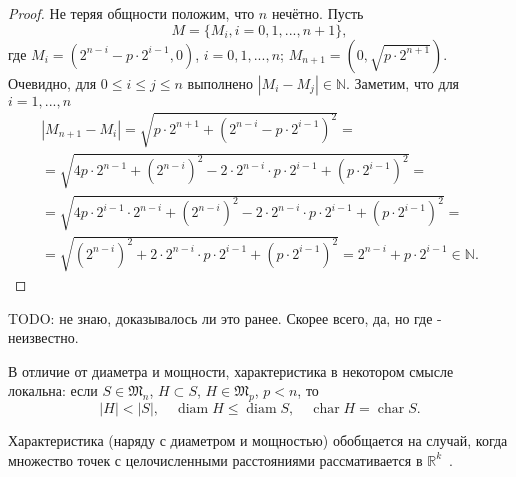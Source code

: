 \begin{proof}
	Не теряя общности положим, что $n$ нечётно.
	Пусть
	\begin{equation*}
		M = \{M_i, i =0,1,...,n+1\},
	\end{equation*}
	где
	$M_i = (2^{n-i}-p\cdot 2^{i-1},0)$, $i=0,1,...,n$;
	$M_{n+1} = (0,\sqrt{p \cdot 2^{n+1}})$.
	Очевидно, для $0\leqslant i \leqslant j \leqslant n$ выполнено
	$|M_i- M_j|\in\mathbb{N}$.
	Заметим, что для $i=1,...,n$
	\begin{multline*}
		|M_{n+1} - M_i| =
		\sqrt{p\cdot 2^{n+1} + (2^{n-i}-p\cdot2^{i-1})^2}
		=
		\\=
		\sqrt{4p\cdot 2^{n-1} + (2^{n-i})^2 - 2 \cdot 2^{n-i} \cdot p \cdot 2^{i-1} + (p\cdot 2^{i-1})^2}
		=
		\\=
		\sqrt{4p\cdot 2^{i-1} \cdot 2^{n-i} + (2^{n-i})^2 - 2 \cdot 2^{n-i} \cdot p \cdot 2^{i-1} + (p\cdot 2^{i-1})^2}
		=
		\\=
		\sqrt{(2^{n-i})^2 + 2 \cdot 2^{n-i} \cdot p \cdot 2^{i-1} + (p\cdot 2^{i-1})^2}
		=
		2^{n-i} + p\cdot 2^{i-1}
		\in\mathbb{N}
		.
	\end{multline*}
\end{proof}

TODO: не знаю, доказывалось ли это ранее. Скорее всего, да, но где - неизвестно.


В отличие от диаметра и мощности, характеристика в некотором смысле локальна:
если $S\in\mathfrak{M}_n$, $H \subset S$, $H\in\mathfrak{M}_{p}$, $p<n$,
то
\begin{equation*}
	|H| < |S|, \quad \operatorname{diam} H \leq \operatorname{diam} S, \quad \operatorname{char} H = \operatorname{char} S
	.
\end{equation*}

Характеристика (наряду с диаметром и мощностью) обобщается на случай, когда множество точек с целочисленными расстояниями
рассмативается в $\mathbb{R}^k$~\cite{kurz2005characteristic}.
